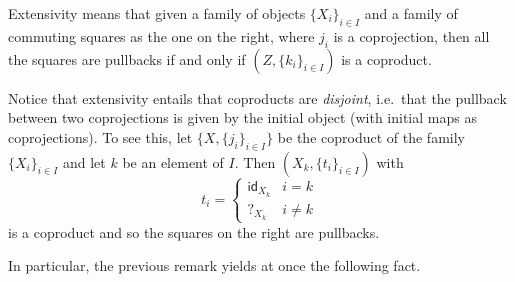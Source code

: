 \documentclass[a4paper,UKenglish,cleveref,pdftex,thm-restate,numberwithinsect]{lipics-v2021}
\def\X{\textbf {\textup{X}}}
\newcommand{\id}[1]{\mathsf{id}_{#1}}
\begin{document}
\noindent 
\parbox{11.5cm}{\hspace{15pt} Extensivity means that given a family of objects $\{X_{i}\}_{i\in I}$ and a family of commuting squares as the one on the right, where $j_i$ is a  coprojection, then all the squares are pullbacks if and only if $(Z, \{k_i\}_{i\in I})$ is a coproduct.}\hfill 
\parbox{2cm}{}

\noindent
\parbox{11cm}{
\begin{remark}\label{rem:disj}
	Notice that extensivity entails that coproducts are \emph{disjoint}, i.e.~that the pullback between two coprojections is given by the initial object (with initial maps as coprojections). To see this, let $\{X, \{j_i\}_{i\in I}\}$ be the coproduct of the family $\{X_i\}_{i\in I}$ and let $k$ be an element of $I$. Then  $(X_k, \{t_i\}_{i\in I})$ with
	\[t_i=\begin{cases}
		\id{X_k} & i=k\\?_{X_k} & i\neq k
	\end{cases}\]
	is a coproduct and so the squares on the right are pullbacks.
\end{remark}}\hfill\parbox{2cm}{\vspace{-1.5cm} \xymatrix@R=15pt{X_k \ar[r]_{\id{X}} \ar[d]_{\id{X}}& X_k \ar@{>->}[d]^{j_k}\\X_k \ar@{>->}[r]^{j_k} & X}}


In particular, the previous remark yields at once the following fact.
\end{document}
